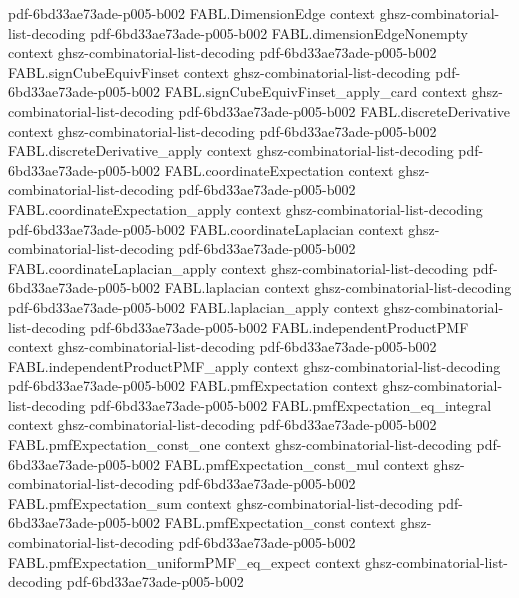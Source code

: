 \begin{theorem}
  {pdf-6bd33ae73ade-p005-b002}
\proofstep
  {FABL.DimensionEdge}
  {context}
  {ghsz-combinatorial-list-decoding}
  {pdf-6bd33ae73ade-p005-b002}
\proofstep
  {FABL.dimensionEdgeNonempty}
  {context}
  {ghsz-combinatorial-list-decoding}
  {pdf-6bd33ae73ade-p005-b002}
\proofstep
  {FABL.signCubeEquivFinset}
  {context}
  {ghsz-combinatorial-list-decoding}
  {pdf-6bd33ae73ade-p005-b002}
\proofstep
  {FABL.signCubeEquivFinset_apply_card}
  {context}
  {ghsz-combinatorial-list-decoding}
  {pdf-6bd33ae73ade-p005-b002}
\proofstep
  {FABL.discreteDerivative}
  {context}
  {ghsz-combinatorial-list-decoding}
  {pdf-6bd33ae73ade-p005-b002}
\proofstep
  {FABL.discreteDerivative_apply}
  {context}
  {ghsz-combinatorial-list-decoding}
  {pdf-6bd33ae73ade-p005-b002}
\proofstep
  {FABL.coordinateExpectation}
  {context}
  {ghsz-combinatorial-list-decoding}
  {pdf-6bd33ae73ade-p005-b002}
\proofstep
  {FABL.coordinateExpectation_apply}
  {context}
  {ghsz-combinatorial-list-decoding}
  {pdf-6bd33ae73ade-p005-b002}
\proofstep
  {FABL.coordinateLaplacian}
  {context}
  {ghsz-combinatorial-list-decoding}
  {pdf-6bd33ae73ade-p005-b002}
\proofstep
  {FABL.coordinateLaplacian_apply}
  {context}
  {ghsz-combinatorial-list-decoding}
  {pdf-6bd33ae73ade-p005-b002}
\proofstep
  {FABL.laplacian}
  {context}
  {ghsz-combinatorial-list-decoding}
  {pdf-6bd33ae73ade-p005-b002}
\proofstep
  {FABL.laplacian_apply}
  {context}
  {ghsz-combinatorial-list-decoding}
  {pdf-6bd33ae73ade-p005-b002}
\proofstep
  {FABL.independentProductPMF}
  {context}
  {ghsz-combinatorial-list-decoding}
  {pdf-6bd33ae73ade-p005-b002}
\proofstep
  {FABL.independentProductPMF_apply}
  {context}
  {ghsz-combinatorial-list-decoding}
  {pdf-6bd33ae73ade-p005-b002}
\proofstep
  {FABL.pmfExpectation}
  {context}
  {ghsz-combinatorial-list-decoding}
  {pdf-6bd33ae73ade-p005-b002}
\proofstep
  {FABL.pmfExpectation_eq_integral}
  {context}
  {ghsz-combinatorial-list-decoding}
  {pdf-6bd33ae73ade-p005-b002}
\proofstep
  {FABL.pmfExpectation_const_one}
  {context}
  {ghsz-combinatorial-list-decoding}
  {pdf-6bd33ae73ade-p005-b002}
\proofstep
  {FABL.pmfExpectation_const_mul}
  {context}
  {ghsz-combinatorial-list-decoding}
  {pdf-6bd33ae73ade-p005-b002}
\proofstep
  {FABL.pmfExpectation_sum}
  {context}
  {ghsz-combinatorial-list-decoding}
  {pdf-6bd33ae73ade-p005-b002}
\proofstep
  {FABL.pmfExpectation_const}
  {context}
  {ghsz-combinatorial-list-decoding}
  {pdf-6bd33ae73ade-p005-b002}
\proofstep
  {FABL.pmfExpectation_uniformPMF_eq_expect}
  {context}
  {ghsz-combinatorial-list-decoding}
  {pdf-6bd33ae73ade-p005-b002}

\end{theorem}
